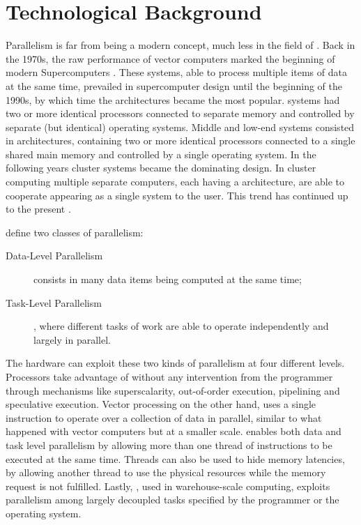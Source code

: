 \documentclass[../thesis]{subfiles}
\begin{document}
	\chapter{Technological Background}
	\label{chp:techbg}

	Parallelism is far from being a modern concept, much less in the field of \hpc. Back in the 1970s, the raw performance of vector computers marked the beginning of modern Supercomputers \cite{Strohmaier:2005:20years}. These systems, able to process multiple items of data at the same time, prevailed in supercomputer design until the beginning of the 1990s, by which time the \mpp architectures became the most popular. \mpp systems had two or more identical processors connected to separate memory and controlled by separate (but identical) operating systems. Middle and low-end systems consisted in \smp architectures, containing two or more identical processors connected to a single shared main memory and controlled by a single operating system. In the following years cluster systems became the dominating design. In cluster computing multiple separate computers, each having a \smp architecture, are able to cooperate appearing as a single system to the user. This trend has continued up to the present \cite{TheNextWave:1:2013:Supercomputers,TOP500:overtime}.

	 define two classes of parallelism:
		\begin{description}
			\item [Data-Level Parallelism] consists in many data items being computed at the same time;
			\item [Task-Level Parallelism], where different tasks of work are able to operate independently and largely in parallel.
		\end{description}
	 The hardware can exploit these two kinds of parallelism at four different levels. Processors take advantage of \ilp without any intervention from the programmer through mechanisms like superscalarity, out-of-order execution, pipelining and speculative execution. Vector processing on the other hand, uses a single instruction to operate over a collection of data in parallel, similar to what happened with vector computers but at a smaller scale. \tlp enables both data and task level parallelism by allowing more than one thread of instructions to be executed at the same time. Threads can also be used to hide memory latencies, by allowing another thread to use the physical resources while the memory request is not fulfilled. Lastly, \rlp, used in warehouse-scale computing, exploits parallelism among largely decoupled tasks specified by the programmer or the operating system.
\end{document}

